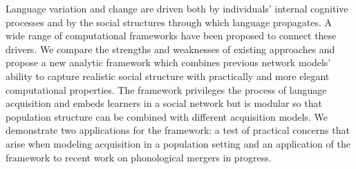 Language variation and change are driven both by individuals' internal cognitive processes and by the social structures through which language propagates. A wide range of computational frameworks have been proposed to connect these drivers. We compare the strengths and weaknesses of existing approaches and propose a new analytic framework which combines previous network models' ability to capture realistic social structure with practically and more elegant computational properties. The framework privileges the process of language acquisition and embeds learners in a social network but is modular so that population structure can be combined with different acquisition models. We demonstrate two applications for the framework: a test of practical concerns that arise when modeling acquisition in a population setting and an application of the framework to recent work on phonological mergers in progress.
